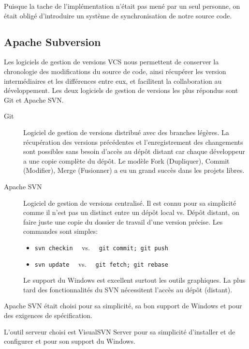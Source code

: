 Puisque la tache de l'implémentation n'était pas mené par un seul personne, on
était obligé d'introduire un système de synchronisation de notre source code.

\subsection{Apache Subversion}

Les logiciels de gestion de versions \acrshort{VCS} nous permettent de
conserver la chronologie des modifications du source de code, ainsi récupérer
les version intermédiaires et les différences entre eux, et facilitent la
collaboration au développement. Les deux logiciels de gestion de versions les
plus répondus sont Git et Apache SVN\@.

\begin{description}
    \item [Git] Logiciel de gestion de versions distribué avec des branches
        légères. La récupération des versions précédentes et l'enregistrement
        des changements sont possibles sans besoin d'accès au dépôt distant car
        chaque développeur a une copie complète du dépôt. Le modèle Fork
        (Dupliquer), Commit (Modifier), Merge (Fusionner) a eu un grand succès
        dans les projets libres.
    \item [Apache SVN] Logiciel de gestion de versions centralisé. Il est connu
        pour sa simplicité comme il n'est pas un distinct entre un dépôt local
        vs. Dépôt distant, on faire juste une copie du dossier de travail d'une
        version précise. Les commandes sont simples:
        \begin{itemize}
            \item \verb|svn checkin| \ \ vs. \ \ \verb|git commit; git push|
            \item \verb|svn update| \ \ vs. \ \ \verb|git fetch; git rebase|
        \end{itemize}
        Le support du Windows est excellent surtout les outils graphiques. La
        plus tard des fonctionnalités du SVN nécessitent l'accès au dépôt
        (distant).
\end{description}

Apache SVN était choisi pour sa simplicité, sa bon support de Windows et pour
des exigences de spécification.

L'outil serveur choisi est VisualSVN Server pour sa simplicité d'installer et
de configurer et pour son support du Windows.

